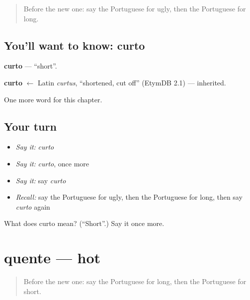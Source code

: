 \label{lesson:PT-C65-curto}



\begin{quote}
Before the new one: say the Portuguese for ugly, then the Portuguese for long.
\end{quote}

\subsection*{You'll want to know: curto}
\textbf{curto} — \textquotedblleft{}short\textquotedblright{}.

\begin{cousinweb}
\textbf{curto} $\leftarrow$ Latin \emph{curtus}, \textquotedblleft{}shortened, cut off\textquotedblright{} (EtymDB 2.1) — inherited.
\end{cousinweb}

\begin{grammarlens}[title={What you've built}]
One more word for this chapter.
\end{grammarlens}

\subsection*{Your turn}
\begin{itemize}
\raggedright
  \item \emph{Say it:} \emph{curto}
  \item \emph{Say it:} \emph{curto}, once more
  \item \emph{Say it:} say \emph{curto}
  \item \emph{Recall:} say the Portuguese for ugly, then the Portuguese for long, then say \emph{curto} again
\end{itemize}

\begin{tcolorbox}[breakable,colback=teal!4,colframe=teal!35!black,title={Before you move on}]
What does curto mean? (\textquotedblleft{}Short\textquotedblright{}.) Say it once more.
\end{tcolorbox}
\section[quente]{quente — hot}

\label{lesson:PT-C65-quente}



\begin{quote}
Before the new one: say the Portuguese for long, then the Portuguese for short.
\end{quote}

